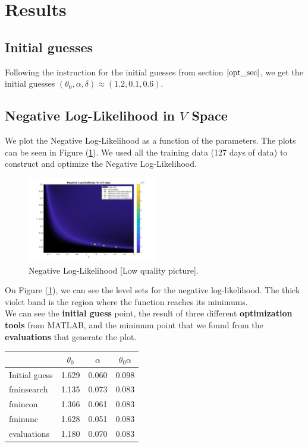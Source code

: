 \documentclass[11pt]{article}
\theoremstyle{definition}
\begin{document}

\section{Results} \label{Section_7}

\subsection{Initial guesses}

Following the instruction for the initial guesses from section $\ref{opt_sec}$, we get the initial guesses $(\theta_0,\alpha,\delta)\approx(1.2,0.1,0.6)$.

\subsection{Negative Log-Likelihood in $V$ Space}

We plot the Negative Log-Likelihood as a function of the parameters. The plots can be seen in Figure (\ref{fig:neg-LL}). We used all the training data (127 days of data) to construct and optimize the Negative Log-Likelihood.

\begin{figure}[H]
\centering
\includegraphics[width=0.5\textwidth]{../../MATLAB_Files/Results/likelihood/normal/Log-Likelihood.jpg}
\caption{Negative Log-Likelihood {\color{red}[Low quality picture]}.}
\label{fig:neg-LL}
\end{figure}
On Figure (\ref{fig:neg-LL}), we can see the level sets for the negative log-likelihood. The thick violet band is the region where the function reaches its minimums.\\
We can see the \textbf{initial guess} point, the result of three different \textbf{optimization tools} from MATLAB, and the minimum point that we found from the \textbf{evaluations} that generate the plot.
\begin{table}[]
\centering
\begin{tabular}{lccc}
\toprule
 & $\theta_0$ & $\alpha$ & $\theta_0\alpha$\\
 \midrule
 Initial guess & 1.629 & 0.060 & 0.098 \\
 fminsearch & 1.135 & 0.073 & 0.083 \\
 fmincon & 1.366 & 0.061 & 0.083 \\
 fminunc & 1.628 & 0.051 & 0.083 \\
 evaluations & 1.180 & 0.070 & 0.083 \\
 \bottomrule
\end{tabular}
\end{table}
\end{document}
